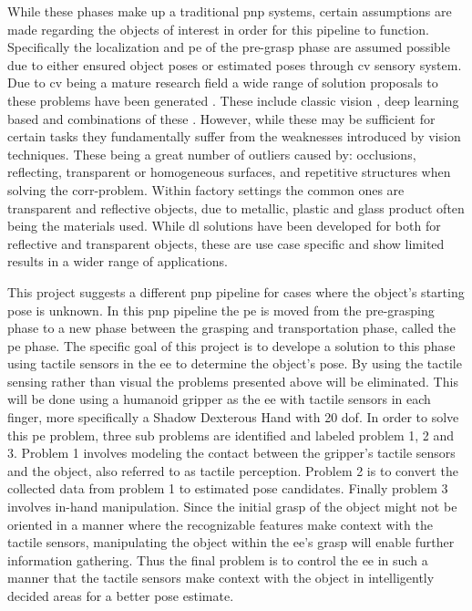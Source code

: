While these phases make up a traditional \gls{pnp} systems, certain assumptions are made regarding the objects of interest in order for this pipeline to function. Specifically the localization and \gls{pe} of the pre-grasp phase are assumed possible due to either ensured object poses or estimated poses through \gls{cv} sensory system. Due to \gls{cv} being a mature research field a wide range of solution proposals to these problems have been generated \cite*{6d-pose-estimation-of-objects:-recent-technologies-and-challenges}. These include classic vision \cite*{3d-object-pose-estimation-using-stereo-vision-for-object-manipulation-system} \cite*{stereo-vision-based-automation-for-a-bin-picking-solution}, deep learning based \cite*{uncalibrated-stereo-vision-with-deep-learning-for-6-dof-pose-estimation-for-a-robot-arm-system} and combinations of these \cite*{stereo-vision-based-single-shot-6d-object-pose-estimation-for-bin-picking-by-a-robot-manipulator}. However, while these may be sufficient for certain tasks they fundamentally suffer from the weaknesses introduced by vision techniques. These being a great number of outliers caused by: occlusions, reflecting, transparent or homogeneous surfaces, and repetitive structures when solving the \gls{corr-problem}. Within factory settings the common ones are transparent and reflective objects, due to metallic, plastic and glass product often being the materials used. While \gls{dl} solutions have been developed for both for reflective \cite*{data-driven-object-pose-estimation-in-a-practical-bin-picking-application} and transparent \cite*{6dof-pose-estimation-of-transparent-object-from-a-single-rgb-d-image} objects, these are use case specific and show limited results in a wider range of applications. \medskip

This project suggests a different \gls{pnp} pipeline for cases where the object's starting pose is unknown. In this \gls{pnp} pipeline the \gls{pe} is moved from the pre-grasping phase to a new phase between the grasping and transportation phase, called the \gls{pe} phase. The specific goal of this project is to develope a solution to this phase using tactile sensors in the \gls{ee} to determine the object's pose. By using the tactile sensing rather than visual the problems presented above will be eliminated. This will be done using a humanoid gripper as the \gls{ee} with tactile sensors in each finger, more specifically a Shadow Dexterous Hand \cite{shadow-dex-hand} with 20 \gls{dof}. In order to solve this \gls{pe} problem, three sub problems are identified and labeled problem 1, 2 and 3.
Problem 1 involves modeling the contact between the gripper's tactile sensors and the object, also referred to as tactile perception. 
Problem 2 is to convert the collected data from problem 1 to estimated pose candidates.
Finally problem 3 involves in-hand manipulation. Since the initial grasp of the object might not be oriented in a manner where the recognizable features make context with the tactile sensors, manipulating the object within the \gls{ee}'s grasp will enable further information gathering. Thus the final problem is to control the \gls{ee} in such a manner that the tactile sensors make context with the object in intelligently decided areas for a better pose estimate. \medskip

